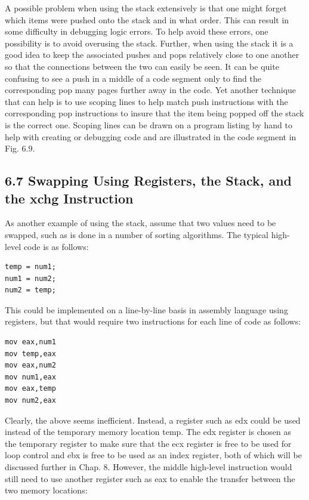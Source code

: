 \documentclass[10pt]{book}
\begin{document}
A possible problem when using the stack extensively is that one might forget which items were pushed onto the stack and in what order. This can result in some difficulty in debugging logic errors. To help avoid these errors, one possibility is to avoid overusing the stack. Further, when using the stack it is a good idea to keep the associated pushes and pops relatively close to one another so that the connections between the two can easily be seen. It can be quite confusing to see a push in a middle of a code segment only to find the corresponding pop many pages further away in the code. Yet another technique that can help is to use scoping lines to help match push instructions with the corresponding pop instructions to insure that the item being popped off the stack is the correct one. Scoping lines can be drawn on a program listing by hand to help with creating or debugging code and are illustrated in the code segment in Fig. 6.9.

\subsection*{6.7 Swapping Using Registers, the Stack, and the xchg Instruction}
As another example of using the stack, assume that two values need to be swapped, such as is done in a number of sorting algorithms. The typical high-level code is as follows:

\begin{verbatim}
temp = num1;
num1 = num2;
num2 = temp;
\end{verbatim}

This could be implemented on a line-by-line basis in assembly language using registers, but that would require two instructions for each line of code as follows:

\begin{verbatim}
mov eax,num1
mov temp,eax
mov eax,num2
mov num1,eax
mov eax,temp
mov num2,eax
\end{verbatim}

Clearly, the above seems inefficient. Instead, a register such as edx could be used instead of the temporary memory location temp. The edx register is chosen as the temporary register to make sure that the ecx register is free to be used for loop control and ebx is free to be used as an index register, both of which will be discussed further in Chap. 8. However, the middle high-level instruction would still need to use another register such as eax to enable the transfer between the two memory locations:
\end{document}
